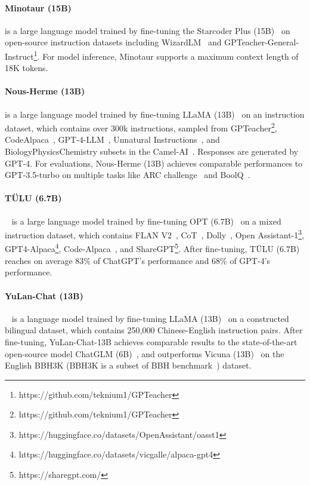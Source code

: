 \documentclass[11pt]{article}
\begin{document}
\paragraph{Minotaur (15B)} is a large language model trained by fine-tuning the Starcoder Plus (15B)~\citep{li2023starcoder} on open-source instruction datasets including WizardLM~\citep{xu2023wizardlm} and GPTeacher-General-Instruct\footnote{https://github.com/teknium1/GPTeacher}. For model inference, Minotaur supports a maximum context length of 18K tokens.


\paragraph{Nous-Herme (13B)} is a large language model trained by fine-tuning LLaMA (13B)~\citep{Touvron2023LLaMAOA} on an instruction dataset, which contains over 300k instructions, sampled from  GPTeacher\footnote{https://github.com/teknium1/GPTeacher}, CodeAlpaca~\citep{chaudhary2023code}, GPT-4-LLM~\citep{peng2023instruction}, Unnatural Instructions~\citep{honovich2022unnatural}, and Biology\/Physics\/Chemistry subsets in the Camel-AI~\citep{li2023camel}. Responses are generated by GPT-4. For evaluations, Nous-Herme (13B) achieves comparable performances to GPT-3.5-turbo on multiple tasks like ARC challenge~\citep{Clark2018ThinkYH} and BoolQ~\citep{Clark2019BoolQET}.

\paragraph{TÜLU (6.7B)}~\citep{Wang2023HowFC} is a large language model trained by fine-tuning OPT (6.7B)~\citep{Zhang2022OPTOP} on a mixed instruction dataset, which contains FLAN V2~\citep{longpre2023flan}, CoT~\citep{Wei2022ChainOT}, Dolly~\citep{conover2023free}, Open Assistant-1\footnote{https://huggingface.co/datasets/OpenAssistant/oasst1}, GPT4-Alpaca\footnote{https://huggingface.co/datasets/vicgalle/alpaca-gpt4}, Code-Alpaca~\citep{chaudhary2023code}, and ShareGPT\footnote{https://sharegpt.com/}. After fine-tuning, TÜLU (6.7B) reaches on average 83\% of ChatGPT's performance and 68\% of GPT-4's performance.

\paragraph{YuLan-Chat (13B)}~\citep{YuLan-Chat} is a language model trained by fine-tuning LLaMA (13B)~\citep{Touvron2023LLaMAOA} on a constructed bilingual dataset, which contains 250,000 Chinese-English instruction pairs. After fine-tuning, YuLan-Chat-13B achieves comparable results to the state-of-the-art open-source model ChatGLM (6B)~\citep{du2022glm}, and outperforms Vicuna (13B)~\citep{chiang2023vicuna} on the English BBH3K (BBH3K is a subset of BBH benchmark~\citep{Srivastava2022BeyondTI}) dataset.
\end{document}
